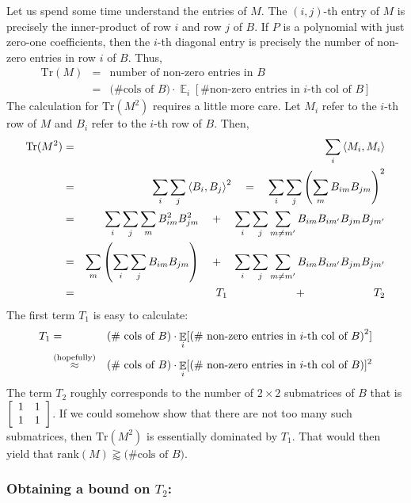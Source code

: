 \documentclass{beatcs}
\newcommand{\rank}{\mathrm{rank}}
\newcommand{\spaced}[1]{\quad#1\quad}
\begin{document}
Let us spend some time understand the entries of $M$. The $(i,j)$-th entry of $M$ is precisely the inner-product of row $i$ and row $j$ of $B$. If $P$ is a polynomial with just zero-one coefficients, then the $i$-th diagonal entry is precisely the number of non-zero entries in row $i$ of $B$. Thus,
\begin{eqnarray*}
\mathrm{Tr}(M) & = & \text{number of non-zero entries in $B$}\\
  & = & \text{(\# cols of $B$)} \cdot \mathop{\mathbb{E}}_i[\text{\# non-zero entries in $i$-th col of $B$}] 
\end{eqnarray*}
The calculation for $\mathrm{Tr}(M^2)$ requires a little more care. Let $M_i$ refer to the $i$-th row of $M$ and $B_i$ refer to the $i$-th row of $B$. Then,
\begin{eqnarray*}
\mathrm{Tr}(M^2) & = & \sum_{i} \inangle{M_i, M_i}\\
 & = & \sum_{i} \sum_j \inangle{B_i, B_j}^2 \spaced{=}\sum_{i} \sum_j \inparen{\sum_m B_{im} B_{jm}}^2\\
 & = & \sum_{i} \sum_j \sum_m B_{im}^2 B_{jm}^2  \spaced{+} \sum_i \sum_j \sum_{m\neq m'} B_{im}B_{im'}B_{jm}B_{jm'}\\
 & = & \sum_{m} \inparen{\sum_i \sum_j B_{im} B_{jm}}  \spaced{+} \sum_i \sum_j \sum_{m\neq m'} B_{im}B_{im'}B_{jm}B_{jm'}\\
 & = & \quad\quad\quad T_1 \quad\quad\quad\quad\quad\quad + \quad\quad\quad\quad\quad\quad T_2
\end{eqnarray*}
The first term $T_1$ is easy to calculate:
\begin{eqnarray*}
T_1 & = & \text{(\# cols of $B$)} \cdot \mathop{\mathbb{E}}_i[\left(\text{\# non-zero entries in $i$-th col of $B$}\right)^2] \\
 & \stackrel{\tiny \text{(hopefully)}}{\approx} & \text{(\# cols of $B$)} \cdot \mathop{\mathbb{E}}_i[\left(\text{\# non-zero entries in $i$-th col of $B$}\right)]^2
\end{eqnarray*}
The term $T_2$ roughly corresponds to the number of $2\times 2$ submatrices of $B$ that is $\left[\begin{array}{cc}1 & 1 \\ 1 & 1\end{array}\right]$. If we could somehow show that there are not too many such submatrices, then $\mathrm{Tr}(M^2)$ is essentially dominated by $T_1$. That would then yield that $\rank(M) \gtrapprox \text{(\# cols of $B$)}$. 

\subsubsection*{Obtaining a bound on $T_2$:}
\end{document}
